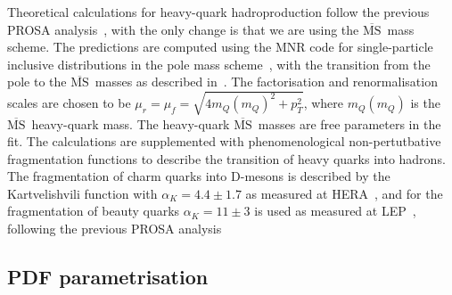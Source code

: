 \documentclass[12pt]{article}
\newcommand{\msbar}{$\overline{\text{MS}}\, $\xspace}
\begin{document}
Theoretical calculations for heavy-quark hadroproduction follow the previous PROSA analysis~\cite{Zenaiev:2015rfa}, with the only change is that we are using the \msbar mass scheme.
The predictions are computed using the MNR code for single-particle inclusive distributions in the pole mass scheme~\cite{Dowling:2013baa}, with the transition from the pole to the \msbar masses as described in~\cite{Dowling:2013baa}.
The factorisation and renormalisation scales are chosen to be $\mu_r = \mu_f = \sqrt{4m_Q(m_Q)^2+p_T^2}$, where $m_Q(m_Q)$ is the \msbar heavy-quark mass. The heavy-quark \msbar masses are free parameters in the fit. 
The calculations are supplemented with phenomenological non-pertutbative fragmentation functions to describe the transition of heavy quarks into hadrons. 
The fragmentation of charm quarks into D-mesons is described by the Kartvelishvili function with $\alpha_K = 4.4 \pm 1.7$ as measured at HERA~\cite{Aaron:2008ac,Chekanov:2008ur}, and for the fragmentation of beauty quarks $\alpha_K = 11 \pm 3$ is used as measured at LEP~\cite{Nason:1999zj}, following the previous PROSA analysis~\cite{Zenaiev:2015rfa}

\subsection{PDF parametrisation}
\label{sec:pdfparam}
\end{document}
